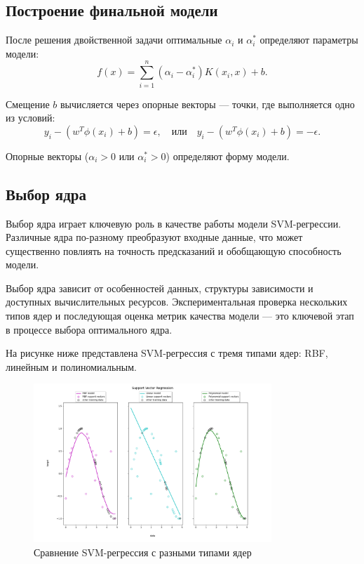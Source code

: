 \subsection{Построение финальной модели}
\par После решения двойственной задачи оптимальные \(\alpha_i\) и \(\alpha_i^*\) определяют параметры модели:
\begin{equation*}
    f(x) = \sum_{i=1}^n (\alpha_i - \alpha_i^*) K(x_i, x) + b.
\end{equation*}
\par Смещение \(b\) вычисляется через опорные векторы — точки, где выполняется одно из условий:
\begin{equation*}
    y_i - (w^T \phi(x_i) + b) = \epsilon, \quad \text{или} \quad y_i - (w^T \phi(x_i) + b) = -\epsilon.
\end{equation*}
\par Опорные векторы (\(\alpha_i > 0\) или \(\alpha_i^* > 0\)) определяют форму модели.

\subsection{Выбор ядра}
\par Выбор ядра играет ключевую роль в качестве работы модели SVM-регрессии. Различные ядра по-разному преобразуют входные данные, что может существенно повлиять на точность предсказаний и обобщающую способность модели.
\par Выбор ядра зависит от особенностей данных, структуры зависимости и доступных вычислительных ресурсов. Экспериментальная проверка нескольких типов ядер и последующая оценка метрик качества модели — это ключевой этап в процессе выбора оптимального ядра.
\par На рисунке ниже представлена SVM-регрессия с тремя типами ядер: RBF, линейным и полиномиальным.
\begin{figure}[ht!]
    \includegraphics[width = 0.8\textwidth]{chapters/svm/images/svm_regression_cmp_models.png}
    \centering
    \caption{Сравнение SVM-регрессия с разными типами ядер}
    \label{fig:kernel_comparison}
\end{figure}

